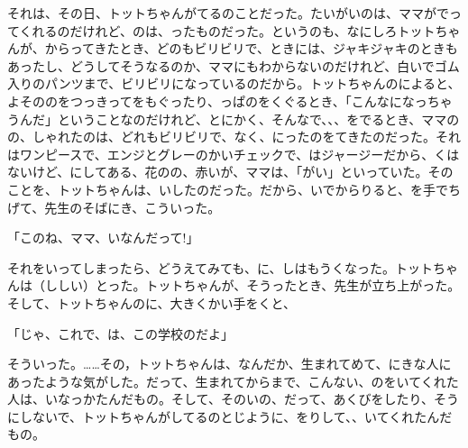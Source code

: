 それは、その日、トットちゃんがてるのことだった。たいがいのは、ママがでってくれるのだけれど、のは、ったものだった。というのも、なにしろトットちゃんが、からってきたとき、どのもビリビリで、ときには、ジャキジャキのときもあったし、どうしてそうなるのか、ママにもわからないのだけれど、白いでゴム入りのパンツまで、ビリビリになっているのだから。トットちゃんのによると、よそののをつっきってをもぐったり、っぱのをくぐるとき、「こんなになっちゃうんだ」ということなのだけれど、とにかく、そんなで、、、をでるとき、ママのの、しゃれたのは、どれもビリビリで、なく、にったのをてきたのだった。それはワンピースで、エンジとグレーのかいチェックで、はジャージーだから、くはないけど、にしてある、花のの、赤いが、ママは、「がい」といっていた。そのことを、トットちゃんは、いしたのだった。だから、いでからりると、を手でちげて、先生のそばにき、こういった。

「このね、ママ、いなんだって!」

それをいってしまったら、どうえてみても、に、しはもうくなった。トットちゃんは（ししい）とった。トットちゃんが、そうったとき、先生が立ち上がった。そして、トットちゃんのに、大きくかい手をくと、

「じゃ、これで、は、この学校のだよ」

そういった。……その，トットちゃんは、なんだか、生まれてめて、にきな人にあったような気がした。だって、生まれてからまで、こんない、のをいてくれた人は、いなっかたんだもの。そして、そのいの、だって、あくびをしたり、そうにしないで、トットちゃんがしてるのとじように、をりして、、いてくれたんだもの。

